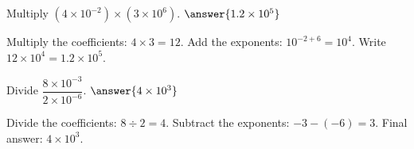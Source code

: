 \documentclass{ximera}
\begin{document}
\begin{problem}
Multiply $(4 \times 10^{-2}) \times (3 \times 10^6)$. $\answer{1.2 \times 10^5}$
\begin{feedback}
Multiply the coefficients: $4 \times 3 = 12$. Add the exponents: $10^{-2+6} = 10^4$. Write $12 \times 10^4 = 1.2 \times 10^5$.
\end{feedback}
\end{problem}

\begin{problem}
Divide $\dfrac{8 \times 10^{-3}}{2 \times 10^{-6}}$. $\answer{4 \times 10^3}$
\begin{feedback}
Divide the coefficients: $8 \div 2 = 4$. Subtract the exponents: $-3 - (-6) = 3$. Final answer: $4 \times 10^3$.
\end{feedback}
\end{problem}

\end{document}
